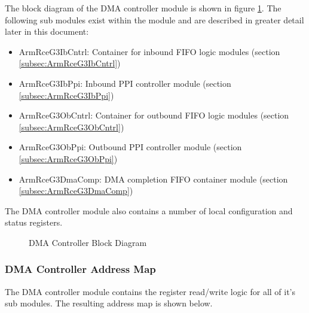 \documentclass[11pt]{article}
\begin{document}
The block diagram of the DMA controller module is shown in figure \ref{fig:dma_cntrl_block}. The following sub modules
exist within the module and are described in greater detail later in this document:

\begin{itemize}
   \item ArmRceG3IbCntrl: Container for inbound FIFO logic modules (section \ref{subsec:ArmRceG3IbCntrl})
   \item ArmRceG3IbPpi: Inbound PPI controller module (section \ref{subsec:ArmRceG3IbPpi})
   \item ArmRceG3ObCntrl: Container for outbound FIFO logic modules (section \ref{subsec:ArmRceG3ObCntrl})
   \item ArmRceG3ObPpi: Outbound PPI controller module (section \ref{subsec:ArmRceG3ObPpi})
   \item ArmRceG3DmaComp: DMA completion FIFO container module (section \ref{subsec:ArmRceG3DmaComp})
\end{itemize}

The DMA controller module also contains a number of local configuration and status registers. 

\begin{figure}[H]
   \centering
   \caption{DMA Controller Block Diagram}
   \label{fig:dma_cntrl_block}
\end{figure}

\subsubsection{DMA Controller Address Map}
The DMA controller module contains the register read/write logic for all of it's sub modules. The resulting address map is shown below.
\end{document}
